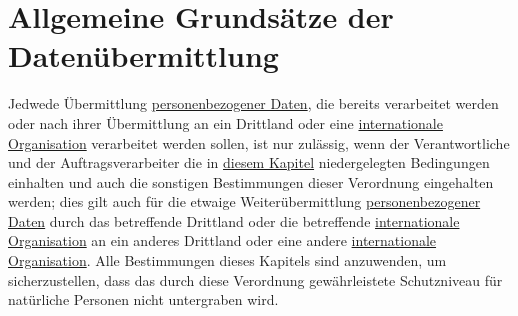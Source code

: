 \chapter{Allgemeine Grundsätze der Datenübermittlung}
\label{ch:44}


Jedwede Übermittlung \hyperref[itm:04-1]{personenbezogener Daten}, die bereits verarbeitet werden oder nach ihrer Übermittlung an ein
Drittland oder eine \hyperref[itm:04-29]{internationale Organisation} verarbeitet werden sollen, ist nur zulässig, wenn der Verantwortliche
und der Auftragsverarbeiter die in \hyperref[part:5]{diesem Kapitel} niedergelegten Bedingungen einhalten und auch die
sonstigen Bestimmungen dieser Verordnung eingehalten werden; dies gilt auch für die etwaige Weiterübermittlung
\hyperref[itm:04-1]{personenbezogener Daten} durch das betreffende Drittland oder die betreffende \hyperref[itm:04-29]{internationale Organisation} an ein anderes
Drittland oder eine andere \hyperref[itm:04-29]{internationale Organisation}. Alle Bestimmungen dieses Kapitels sind anzuwenden, um
sicherzustellen, dass das durch diese Verordnung gewährleistete Schutzniveau für natürliche Personen nicht untergraben
wird.


